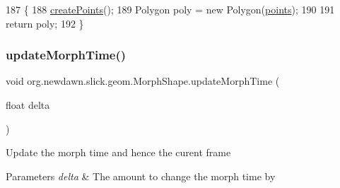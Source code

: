 \begin{DoxyCode}
187                                                 \{
188         \mbox{\hyperlink{classorg_1_1newdawn_1_1slick_1_1geom_1_1_morph_shape_a7c393dbb6244ecd3c7e6165ce135e1e8}{createPoints}}();
189         Polygon poly = \textcolor{keyword}{new} Polygon(\mbox{\hyperlink{classorg_1_1newdawn_1_1slick_1_1geom_1_1_shape_a8b4d4058734bbb3b96072e470b92aa37}{points}});
190         
191         \textcolor{keywordflow}{return} poly;
192     \}
\end{DoxyCode}
\mbox{\label{classorg_1_1newdawn_1_1slick_1_1geom_1_1_morph_shape_afc0521e77e821a34363c87725b5fd3e8}} 
\subsubsection{\texorpdfstring{update\+Morph\+Time()}{updateMorphTime()}}
{\footnotesize\ttfamily void org.\+newdawn.\+slick.\+geom.\+Morph\+Shape.\+update\+Morph\+Time (\begin{DoxyParamCaption}\item[{float}]{delta }\end{DoxyParamCaption})\hspace{0.3cm}{\ttfamily [inline]}}

Update the morph time and hence the curent frame


\begin{DoxyParams}{Parameters}
{\em delta} & The amount to change the morph time by \\
\hline
\end{DoxyParams}

